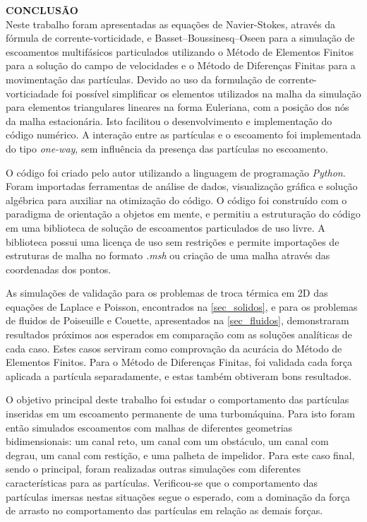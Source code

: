 \noindent\textbf{CONCLUSÃO}
\\

Neste trabalho foram apresentadas as equações de Navier-Stokes, através da fórmula de corrente-vorticidade, e Basset–Boussinesq–Oseen para a simulação de escoamentos multifásicos particulados utilizando o Método de Elementos Finitos para a solução do campo de velocidades e o Método de Diferenças Finitas para a movimentação das partículas.
Devido ao uso da formulação de corrente-vorticiadade foi possível simplificar os elementos utilizados na malha da simulação para elementos triangulares lineares na forma Euleriana, com a posição dos nós da malha estacionária.
Isto facilitou o desenvolvimento e implementação do código numérico.
A interação entre as partículas e o escoamento foi implementada do tipo \textit{one-way}, sem influência da presença das partículas no escoamento.

O código foi criado pelo autor utilizando a linguagem de programação \textit{Python}.
Foram importadas ferramentas de análise de dados, visualização gráfica e solução algébrica para auxiliar na otimização do código.
O código foi construído com o paradigma de orientação a objetos em mente, e permitiu a estruturação do código em uma biblioteca de solução de escoamentos particulados de uso livre.
A biblioteca possui uma licença de uso sem restrições e permite importações de estruturas de malha no formato \textit{.msh} ou criação de uma malha através das coordenadas dos pontos.

As simulações de validação para os problemas de troca térmica em 2D das equações de Laplace e Poisson, encontrados na \ref{sec_solidos}, e para os problemas de fluidos de Poiseuille e Couette, apresentados na \ref{sec_fluidos}, demonstraram resultados próximos aos esperados em comparação com as soluções analíticas de cada caso.
Estes casos serviram como comprovação da acurácia do Método de Elementos Finitos.
Para o Método de Diferenças Finitas, foi validada cada força aplicada a partícula separadamente, e estas também obtiveram bons resultados.

O objetivo principal deste trabalho foi estudar o comportamento das partículas inseridas em um escoamento permanente de uma turbomáquina.
Para isto foram então simulados escoamentos com malhas de diferentes geometrias bidimensionais: um canal reto, um canal com um obstáculo, um canal com degrau, um canal com restição, e uma palheta de impelidor.
Para este caso final, sendo o principal, foram realizadas outras simulações com diferentes características para as partículas.
Verificou-se que o comportamento das partículas imersas nestas situações segue o esperado, com a dominação da força de arrasto no comportamento das partículas em relação as demais forças.

